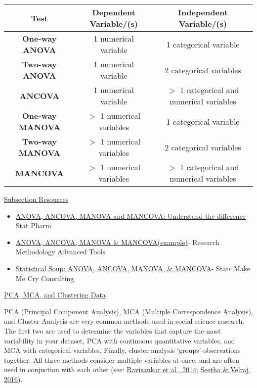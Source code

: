 \documentclass{article}
\begin{document}
\begin{center}
    \begin{tabular}{|c|c|c|}
    \hline
      \textbf{Test}   & \textbf{Dependent Variable/(s}) & \textbf{Independent Variable/(s})\\
      \hline
       \textbf{One-way ANOVA}  & 1 numerical variable & 1 categorical variable\\
       \hline
       \textbf{Two-way ANOVA} & 1 numerical variable & 2 categorical variables\\
       \hline
       \textbf{ANCOVA} & 1 numerical variable & $>$ 1 categorical and numerical variables\\
       \hline
       \textbf{One-way MANOVA} & $>$ 1 numerical variables & 1 categorical variable\\
       \hline
       \textbf{Two-way MANOVA} & $>$ 1 numerical variables & 2 categorical variables\\
       \hline
       \textbf{MANCOVA} & $>$ 1 numerical variables & $>$ 1 categorical and numerical variables\\
       \hline
    \end{tabular}
\end{center}

\underline{Subsection Resources}

\begin{itemize}
    \item \href{https://www.youtube.com/watch?v=Q116ZnLy5uA}{ANOVA, ANCOVA, MANOVA and MANCOVA: Understand the difference}- Stat Pharm
    \item \href{https://www.youtube.com/watch?v=S43Vwr6ofMY}{ANOVA, ANCOVA, MANOVA \& MANCOVA(example)}- Research Methodology Advanced Tools
    \item \href{https://www.statsmakemecry.com/smmctheblog/stats-soup-anova-ancova-manova-mancova}{Statistical Soup: ANOVA, ANCOVA, MANOVA, \& MANCOVA}- Stats Make Me Cry Consulting
\end{itemize}

\underline{PCA, MCA, and Clustering Data}

PCA (Principal Component Analysis), MCA (Multiple Correspondence Analysis), and Cluster Analysis are very common methods used in social science research. The first  two are used to determine the variables that capture the most variability in your dataset, PCA with continuous quantitative variables, and MCA with categorical variables. Finally, cluster analysis ‘groups' observations together. All three methods consider multiple variables at once, and are often used in conjuction with each other (see: \protect\hyperlink{ravisankar}{Ravisankar et al., 2014}; \protect\hyperlink{seetha}{Seetha \& Velraj, 2016}).
\end{document}
